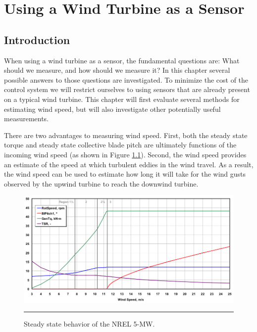 
\chapter{Using a Wind Turbine as a Sensor} %

\label{Chapter2} %



\section{Introduction}

When using a wind turbine as a sensor, the fundamental questions are: What should we measure, and how should we measure it? In this chapter several possible answers to those questions are investigated. To minimize the cost of the control system we will restrict ourselves to using sensors that are already present on a typical wind turbine. This chapter will first evaluate several methods for estimating wind speed, but will also investigate other potentially useful measurements.

There are two advantages to measuring wind speed.  First, both the steady state torque and steady state collective blade pitch are ultimately functions of the incoming wind speed (as shown in Figure \ref{fig2-1}).  Second, the wind speed provides an estimate of the speed at which turbulent eddies in the wind travel. As a result, the wind speed can be used to estimate how long it will take for the wind gusts observed by the upwind turbine to reach the downwind turbine. 


\begin{figure}[htbp]
	\centering
		\includegraphics{Figures/ch2Figures/fig2-1.png}
		\rule{35em}{0.5pt}
	\caption{Steady state behavior of the NREL 5-MW.\cite{jonkman2009}}
	\label{fig2-1}
\end{figure}

